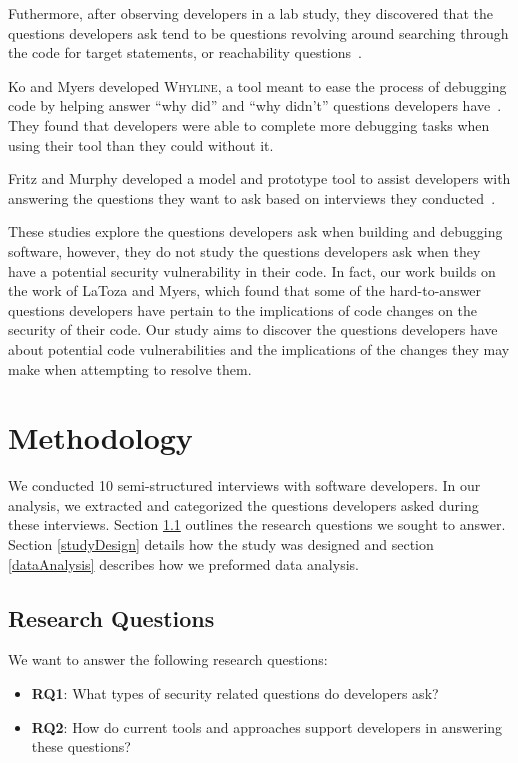 \documentclass[conference]{IEEEtran}
\begin{document}
Futhermore, after observing developers in a lab study, they discovered that the questions developers ask tend to be questions revolving around searching through the code for target statements, or reachability questions~\cite{latoza2010developers}. 

Ko and Myers developed \textsc{Whyline}, a tool meant to ease the process of debugging code by helping answer ``why did'' and ``why didn't'' questions developers have~\cite{ko2004designing}. They found that developers were able to complete more debugging tasks when using their tool than they could without it.

Fritz and Murphy developed a model and prototype tool to assist developers with answering the questions they want to ask based on interviews they conducted~\cite{fritz2010using}.


These studies explore the questions developers ask when building and debugging software, however, they do not study the questions developers ask when they have a potential security vulnerability in their code. 
In fact, our work builds on the work of LaToza and Myers, which found that some of the hard-to-answer questions developers have pertain to the implications of code changes on the security of their code. 
Our study aims to discover the questions developers have about potential code vulnerabilities and the implications of the changes they may make when attempting to resolve them. 

\section{Methodology}
\label{sec:meth}
We conducted 10 semi-structured interviews with software developers. In our analysis, we extracted and categorized the questions developers asked during these interviews. Section \ref{rqs} outlines the research questions we sought to answer. Section \ref{studyDesign} details how the study was designed and section \ref{dataAnalysis} describes how we preformed data analysis.


\subsection{Research Questions}
\label{rqs}
We want to answer the following research questions:
\begin{itemize}
\item \textbf{RQ1}: What types of security related questions do developers ask?
\item \textbf{RQ2}: How do current tools and approaches support developers in answering these questions?
\end{itemize}
\end{document}
